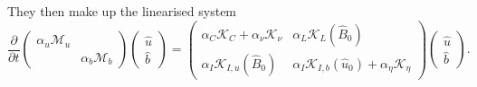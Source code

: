 They then make up the linearised system
\begin{equation}
    \frac{\partial}{\partial t} \begin{pmatrix} \alpha_u \mathcal{M}_u & \\ & \alpha_b \mathcal{M}_b \end{pmatrix}
    \begin{pmatrix} \hat{u} \\ \hat{b} \end{pmatrix} = 
    \begin{pmatrix}
        \alpha_C \mathcal{K}_C + \alpha_\nu \mathcal{K}_\nu & \alpha_L \mathcal{K}_{L}(\hat{B}_0) \\ 
        \alpha_I \mathcal{K}_{I,u}(\hat{B}_0) & \alpha_I \mathcal{K}_{I,b}(\hat{u}_0) + \alpha_\eta \mathcal{K}_\eta
    \end{pmatrix}
    \begin{pmatrix} \hat{u} \\ \hat{b} \end{pmatrix}.
\end{equation}

